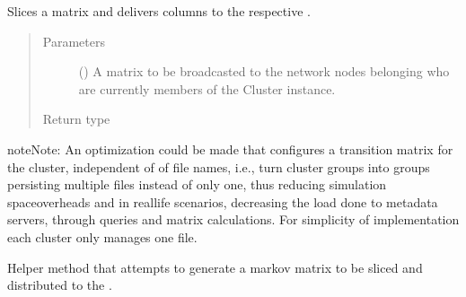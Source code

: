 \documentclass[letterpaper,10pt,english]{sphinxmanual}
\begin{document}
\begin{fulllineitems}

\begin{fulllineitems}
\label{\detokenize{app.domain:app.domain.cluster_groups.SGCluster.broadcast_transition_matrix}}
Slices a  matrix and delivers columns to the respective
{\hyperref[\detokenize{app.domain:app.domain.network_nodes.SGNode}]{}}.
\begin{quote}\begin{description}
\item[{Parameters}] \leavevmode
{} () \textendash{} A matrix to be broadcasted to the network nodes
belonging who are currently members of the Cluster instance.

\item[{Return type}] \leavevmode
{}

\end{description}\end{quote}

\begin{sphinxadmonition}{note}{Note:}
An optimization could be made that configures a transition matrix
for the cluster, independent of of file names, i.e., turn cluster
groups into groups persisting multiple files instead of only one,
thus reducing simulation spaceoverheads and in real\sphinxhyphen{}life
scenarios, decreasing the load done to metadata servers, through
queries and matrix calculations. For simplicity of implementation
each cluster only manages one file.
\end{sphinxadmonition}

\end{fulllineitems}


\begin{fulllineitems}
\label{\detokenize{app.domain:app.domain.cluster_groups.SGCluster.create_and_bcast_new_transition_matrix}}
Helper method that attempts to generate a markov matrix to be
sliced and distributed to the 
{\hyperref[\detokenize{app.domain:app.domain.cluster_groups.Cluster.members}]{}}.


\end{fulllineitems}
\end{fulllineitems}
\end{document}

